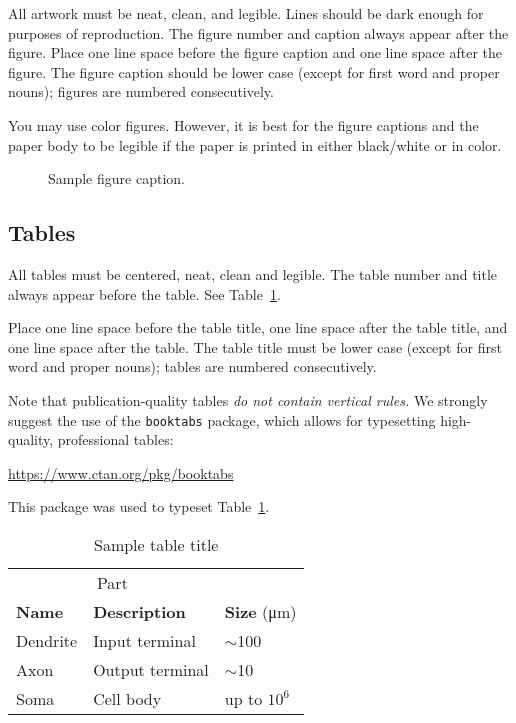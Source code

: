 \documentclass{article}
\begin{document}
All artwork must be neat, clean, and legible. Lines should be dark
enough for purposes of reproduction. The figure number and caption
always appear after the figure. Place one line space before the figure
caption and one line space after the figure. The figure caption should
be lower case (except for first word and proper nouns); figures are
numbered consecutively.

You may use color figures.  However, it is best for the figure
captions and the paper body to be legible if the paper is printed in
either black/white or in color.
\begin{figure}[h]
  \centering
  \caption{Sample figure caption.}
  \label{fig:example}
\end{figure}

\subsection{Tables}

All tables must be centered, neat, clean and legible.  The table
number and title always appear before the table.  See
Table~\ref{sample-table}.

Place one line space before the table title, one line space after the
table title, and one line space after the table. The table title must
be lower case (except for first word and proper nouns); tables are
numbered consecutively.

Note that publication-quality tables \emph{do not contain vertical
  rules.} We strongly suggest the use of the \verb+booktabs+ package,
which allows for typesetting high-quality, professional tables:
\begin{center}
  \url{https://www.ctan.org/pkg/booktabs}
\end{center}
This package was used to typeset Table~\ref{sample-table}.

\begin{table}[t]
  \caption{Sample table title}
  \label{sample-table}
  \centering
  \begin{tabular}{lll}
    \toprule
    \multicolumn{2}{c}{Part}                   \\
    \cmidrule{1-2}
    \textbf{Name}     & \textbf{Description}     & \textbf{Size} (\si{\micro\m}) \\
    \midrule
    Dendrite & Input terminal  & $\sim$100     \\
    Axon     & Output terminal & $\sim$10      \\
    Soma     & Cell body       & up to $10^6$  \\
    \bottomrule
  \end{tabular}
\end{table}
\end{document}

